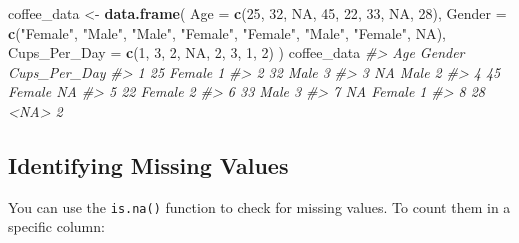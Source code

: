 \documentclass[
]{book}
\newenvironment{Shaded}{\begin{snugshade}}{\end{snugshade}}
\newcommand{\AttributeTok}[1]{\textcolor[rgb]{0.13,0.29,0.53}{#1}}
\newcommand{\CommentTok}[1]{\textcolor[rgb]{0.56,0.35,0.01}{\textit{#1}}}
\newcommand{\ConstantTok}[1]{\textcolor[rgb]{0.56,0.35,0.01}{#1}}
\newcommand{\DecValTok}[1]{\textcolor[rgb]{0.00,0.00,0.81}{#1}}
\newcommand{\FunctionTok}[1]{\textcolor[rgb]{0.13,0.29,0.53}{\textbf{#1}}}
\newcommand{\NormalTok}[1]{#1}
\newcommand{\OtherTok}[1]{\textcolor[rgb]{0.56,0.35,0.01}{#1}}
\newcommand{\SpecialCharTok}[1]{\textcolor[rgb]{0.81,0.36,0.00}{\textbf{#1}}}
\newcommand{\StringTok}[1]{\textcolor[rgb]{0.31,0.60,0.02}{#1}}
\begin{document}
\begin{Shaded}
\begin{Highlighting}[]
\NormalTok{coffee\_data }\OtherTok{\textless{}{-}} \FunctionTok{data.frame}\NormalTok{(}
  \AttributeTok{Age =} \FunctionTok{c}\NormalTok{(}\DecValTok{25}\NormalTok{, }\DecValTok{32}\NormalTok{, }\ConstantTok{NA}\NormalTok{, }\DecValTok{45}\NormalTok{, }\DecValTok{22}\NormalTok{, }\DecValTok{33}\NormalTok{, }\ConstantTok{NA}\NormalTok{, }\DecValTok{28}\NormalTok{),}
  \AttributeTok{Gender =} \FunctionTok{c}\NormalTok{(}\StringTok{"Female"}\NormalTok{, }\StringTok{"Male"}\NormalTok{, }\StringTok{"Male"}\NormalTok{, }\StringTok{"Female"}\NormalTok{, }\StringTok{"Female"}\NormalTok{, }\StringTok{"Male"}\NormalTok{, }\StringTok{"Female"}\NormalTok{, }\ConstantTok{NA}\NormalTok{),}
  \AttributeTok{Cups\_Per\_Day =} \FunctionTok{c}\NormalTok{(}\DecValTok{1}\NormalTok{, }\DecValTok{3}\NormalTok{, }\DecValTok{2}\NormalTok{, }\ConstantTok{NA}\NormalTok{, }\DecValTok{2}\NormalTok{, }\DecValTok{3}\NormalTok{, }\DecValTok{1}\NormalTok{, }\DecValTok{2}\NormalTok{)}
\NormalTok{)}
\NormalTok{coffee\_data}
\CommentTok{\#\textgreater{}   Age Gender Cups\_Per\_Day}
\CommentTok{\#\textgreater{} 1  25 Female            1}
\CommentTok{\#\textgreater{} 2  32   Male            3}
\CommentTok{\#\textgreater{} 3  NA   Male            2}
\CommentTok{\#\textgreater{} 4  45 Female           NA}
\CommentTok{\#\textgreater{} 5  22 Female            2}
\CommentTok{\#\textgreater{} 6  33   Male            3}
\CommentTok{\#\textgreater{} 7  NA Female            1}
\CommentTok{\#\textgreater{} 8  28   \textless{}NA\textgreater{}            2}
\end{Highlighting}
\end{Shaded}

\subsection*{Identifying Missing Values}\label{identifying-missing-values}

You can use the \texttt{is.na()} function to check for missing values. To count
them in a specific column:

\begin{Shaded}
\end{Shaded}
\end{document}
